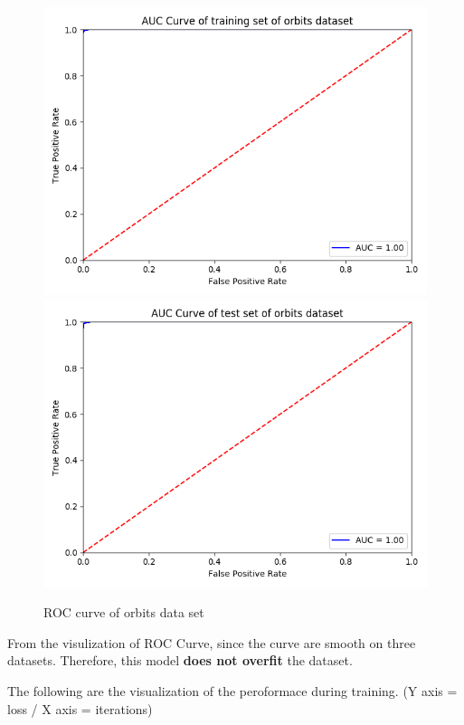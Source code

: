 \documentclass{article}
\begin{document}
\begin{figure}[h]
  \centering
  \includegraphics[scale=0.3]{orbits_auc_train.png}
  \includegraphics[scale=0.3]{orbits_auc_test.png}
  \caption{ROC curve of orbits data set}
\end{figure}

From the visulization of ROC Curve, since the curve are smooth on three datasets. Therefore, this model \textbf{does not overfit} the dataset.  

\pagebreak

The following are the visualization of the peroformace during training. (Y axis = loss / X axis = iterations)
\end{document}
